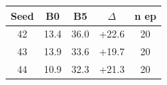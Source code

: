 \begin{tabular}{c cc cc}
\toprule
Seed & B0 & B5 & $\Delta$ & n ep \\
\midrule
42 & 13.4 & 36.0 & +22.6 & 20 \\
43 & 13.9 & 33.6 & +19.7 & 20 \\
44 & 10.9 & 32.3 & +21.3 & 20 \\
\bottomrule
\end{tabular}
